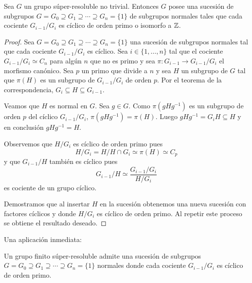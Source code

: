 \begin{theorem}
	\label{theorem:ZorCp}
	Sea $G$ un grupo súper-resoluble no trivial. Entonces $G$ posee una sucesión
	de subgrupos $G=G_0\supseteq G_1\supseteq\cdots\supseteq G_n=\{1\}$ de
	subgrupos normales tales que cada cociente $G_{i-1}/G_i$ es cíclico de
	orden primo o isomorfo a $\mathbb{Z}$.
\end{theorem}

\begin{proof}
	Sea $G=G_0\supseteq G_1\supseteq\cdots\supseteq G_n=\{1\}$ una sucesión de
	subgrupos normales tal que cada cociente $G_{i-1}/G_i$ es cíclico. Sea
	$i\in\{1,\dots,n\}$ tal que el cociente $G_{i-1}/G_i\simeq C_n$ para algún
	$n$ que no es primo y sea $\pi\colon G_{i-1}\to G_{i-1}/G_i$ el morfismo
	canónico.  Sea $p$ un primo que divide a $n$ y sea $H$ un subgrupo de $G$
	tal que $\pi(H)$ es un subgrupo de $G_{i-1}/G_i$ de orden $p$. Por el
	teorema de la correspondencia, $G_{i}\subseteq H\subseteq G_{i-1}$. 
	
	Veamos que $H$ es normal en $G$. Sea $g\in G$. Como $\pi(gHg^{-1})$ es un
	subgrupo de orden $p$ del cíclico $G_{i-1}/G_i$, $\pi(gHg^{-1})=\pi(H)$. Luego
	$gHg^{-1}=G_{i}H\subseteq H$ y en conclusión $gHg^{-1}=H$. 

    Observemos que $H/G_i$ es cíclico de orden
	primo pues 
	\[
		H/G_i=H/H\cap G_i\simeq \pi(H)\simeq C_p
	\]
	y que $G_{i-1}/H$ también es cíclico pues 
	\[
	G_{i-1}/H\simeq\frac{G_{i-1}/G_i}{H/G_i}
	\]
	es cociente de un grupo cíclico.
	
	Demostramos que al insertar $H$ en la
	sucesión obtenemos una nueva sucesión con factores cíclicos y donde
	$H/G_{i}$ es cíclico de orden primo. Al repetir este proceso se obtiene el
	resultado deseado.
\end{proof}

Una aplicación inmediata:

\begin{corollary}
	Un grupo finito súper-resoluble admite una sucesión de subgrupos 
	$G=G_0\supseteq G_1\supseteq\cdots\supseteq G_n=\{1\}$ 
	normales donde cada cociente $G_{i-1}/G_i$ es cíclico de orden primo.
\end{corollary}


